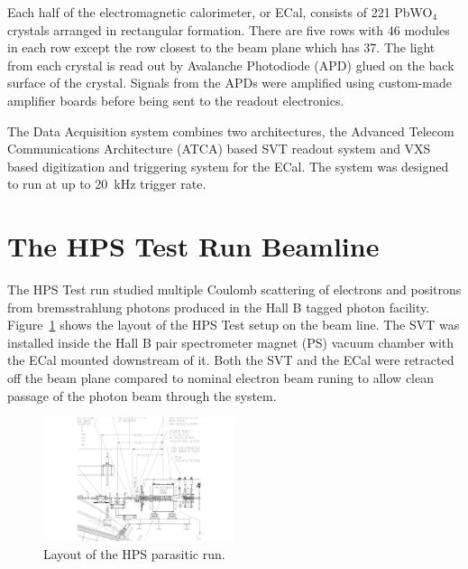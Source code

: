\documentclass[final,3p,times,twocolumn]{elsarticle}
\begin{document}
Each half of the electromagnetic calorimeter, or ECal, consists of 221 PbWO$_4$ crystals arranged 
in rectangular formation. There are five rows with 46 modules in each row except the row closest to 
the beam plane which has 37. The light from each crystal 
is read out by Avalanche Photodiode (APD) glued on the back surface of the crystal. 
Signals from the APDs were amplified using custom-made amplifier boards before being sent to the 
readout electronics.  

The  Data Acquisition system combines two architectures, the Advanced Telecom Communications 
Architecture (ATCA) based SVT readout system and VXS based digitization and triggering system for 
the ECal. The system was designed to run at up to 20~kHz trigger rate.




\section{The HPS Test Run Beamline}
The HPS Test run studied multiple Coulomb scattering of electrons and positrons from 
bremsstrahlung photons produced in the Hall B tagged photon facility. 
Figure~\ref{fig:hpstest_layout} shows the layout of 
the HPS Test setup on the beam line. The SVT was installed inside the Hall B pair 
spectrometer magnet (PS) vacuum chamber with the ECal mounted downstream of it. Both the 
SVT and the ECal were retracted off the beam plane compared to nominal electron beam runing to 
allow clean passage of the photon beam through the system. 
\begin{figure}[ht]
    \includegraphics[width=0.5\textwidth]{figures/HPS_dimensions}
\caption{\small{Layout of the HPS parasitic run.} }
\label{fig:hpstest_layout}
\end{figure}
\end{document}
